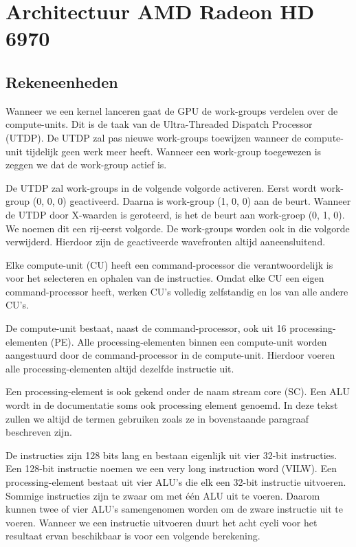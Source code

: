 
\section{Architectuur AMD Radeon HD 6970}
\subsection{Rekeneenheden}

Wanneer we een kernel lanceren gaat de GPU de work-groups verdelen over de compute-units. Dit is de taak van de Ultra-Threaded Dispatch Processor (UTDP). De UTDP zal pas nieuwe work-groups toewijzen wanneer de compute-unit tijdelijk geen werk meer heeft.  Wanneer een work-group toegewezen is zeggen we dat de work-group actief is. 

\label{WGvolg}
De UTDP zal work-groups in de volgende volgorde activeren. Eerst wordt work-group (0, 0, 0) geactiveerd. Daarna is work-group (1, 0, 0) aan de beurt. Wanneer de UTDP door X-waarden is geroteerd, is het de beurt aan work-groep (0, 1, 0). We noemen dit een rij-eerst volgorde. De work-groups worden ook in die volgorde verwijderd. Hierdoor zijn de geactiveerde wavefronten altijd aaneensluitend.\cite[p.~6-8]{amd}

Elke compute-unit (CU) heeft een command-processor die verantwoordelijk is voor het selecteren en ophalen van de instructies. Omdat elke CU een eigen command-processor heeft, werken CU's volledig zelfstandig en los van alle andere CU's.

De compute-unit bestaat, naast de command-processor, ook uit 16 processing-elementen (PE). Alle processing-elementen binnen een compute-unit worden aangestuurd door de command-processor in de compute-unit. Hierdoor voeren alle processing-elementen altijd dezelfde instructie uit.

Een processing-element is ook gekend onder de naam stream core (SC). Een ALU wordt in de documentatie soms ook processing element genoemd. In deze tekst zullen we altijd de termen gebruiken zoals ze in bovenstaande paragraaf beschreven zijn.

De instructies zijn 128 bits lang en bestaan eigenlijk uit vier 32-bit instructies. Een 128-bit instructie noemen we een very long instruction word (VILW). Een processing-element bestaat uit vier ALU's die elk een 32-bit instructie uitvoeren. Sommige instructies zijn te zwaar om met \'e\'en ALU uit te voeren. Daarom kunnen twee of vier ALU's samengenomen worden om de zware instructie uit te voeren. Wanneer we een instructie uitvoeren duurt het acht cycli voor het resultaat ervan beschikbaar is voor een volgende berekening.

